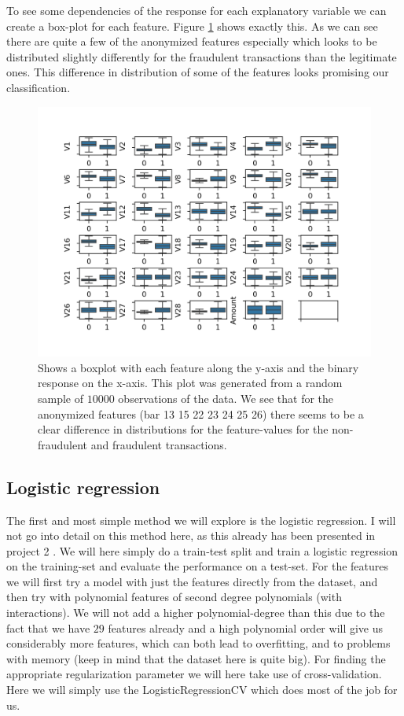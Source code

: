 \documentclass{article}
\begin{document}
To see some dependencies of the response for each explanatory variable we can
create a box-plot for each feature. Figure \ref{databoxplot} shows exactly
this. As we can see there are quite a few of the anonymized features especially
which looks to be distributed slightly differently for the fraudulent
transactions than the legitimate ones. This difference in distribution of some
of the features looks promising our classification.


\begin{figure}
	\centering
	\includegraphics[scale=0.8]{data_features_boxplot}
	\caption{Shows a boxplot with each feature along the y-axis and the
		binary response on the x-axis. This plot was generated from a random
		sample of $10 000$ observations of the data. We see that for the anonymized
		features (bar 13 15 22 23 24 25 26) there seems to be a clear difference in
		distributions for the feature-values for the non-fraudulent and fraudulent
		transactions.}
	\label{databoxplot}
\end{figure}


\subsection{Logistic regression}
The first and most simple method we will explore is the logistic regression. I
will not go into detail on this method here, as this already has been presented
in project 2 \cite{githubrepoproject2}. We will here simply do a train-test
split and train a logistic regression on the training-set and evaluate the
performance on a test-set. For the features we will first try a model with just
the features directly from the dataset, and then try with polynomial features
of second degree polynomials (with interactions). We will not add a higher
polynomial-degree than this due to the fact that we have $29$ features already and
a high polynomial order will give us considerably more features, which can both
lead to overfitting, and to problems with memory (keep in mind that the dataset
here is quite big). For finding the appropriate regularization parameter we
will here take use of cross-validation. Here we will simply use the
LogisticRegressionCV which does most of the job for us.
\end{document}
